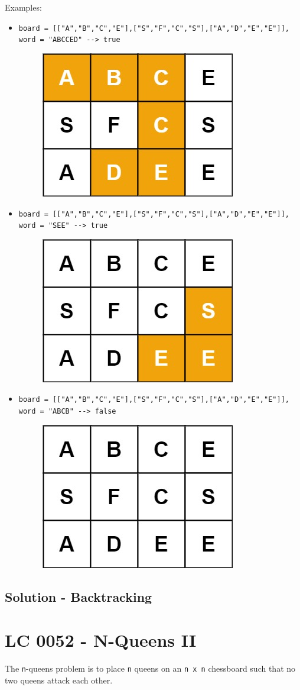 Examples:
\begin{itemize}
	\item {\colorbox{CodeBackground}{\lstinline|board = [["A","B","C","E"],["S","F","C","S"],["A","D","E","E"]], word = "ABCCED" --> true|}}
	\begin{figure}[H]
		\centering
		\includegraphics[width=0.2\linewidth]{images/lc0079_example1}
		\label{fig:lc0079example1}
	\end{figure}
	\item {\colorbox{CodeBackground}{\lstinline|board = [["A","B","C","E"],["S","F","C","S"],["A","D","E","E"]], word = "SEE" --> true|}}
	\begin{figure}[H]
		\centering
		\includegraphics[width=0.2\linewidth]{images/lc0079_example2}
		\label{fig:lc0079example2}
	\end{figure}
	\item {\colorbox{CodeBackground}{\lstinline|board = [["A","B","C","E"],["S","F","C","S"],["A","D","E","E"]], word = "ABCB" --> false|}}
	\begin{figure}[H]
		\centering
		\includegraphics[width=0.2\linewidth]{images/lc0079_example3}
		\label{fig:lc0079example3}
	\end{figure}
\end{itemize}

\subsection*{Solution - Backtracking}

\section{LC 0052 - N-Queens II}
The {\colorbox{CodeBackground}{\lstinline|n|}}-queens problem is to place {\colorbox{CodeBackground}{\lstinline|n|}} queens on an {\colorbox{CodeBackground}{\lstinline|n x n|}} chessboard such that no two queens attack each other.\\

